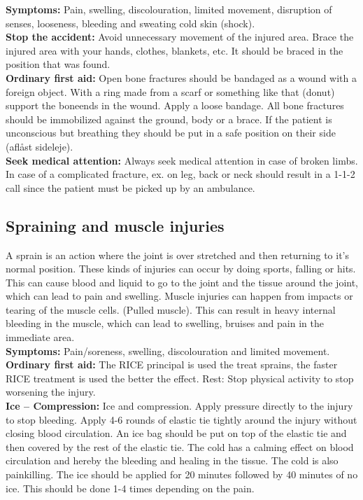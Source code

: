 \documentclass[../../../main.tex]{subfiles}
\begin{document}
\begin{multicols}{2}
\textbf{Symptoms:} Pain, swelling, discolouration, limited movement, disruption of senses, looseness, bleeding and sweating cold skin (shock).
\\

\textbf{Stop the accident:} Avoid unnecessary movement of the injured area. Brace the injured area with your hands, clothes, blankets, etc. It should be braced in the position that was found.
\\

\textbf{Ordinary first aid:} Open bone fractures should be bandaged as a wound with a foreign object. With a ring made from a scarf or something like that (donut) support the boneends in the wound. Apply a loose bandage. All bone fractures should be immobilized against the ground, body or a brace. If the patient is unconscious but breathing they should be put in a safe position on their side (aflåst sideleje).
\\

\textbf{Seek medical attention:} Always seek medical attention in case of broken limbs. In case of a complicated fracture, ex. on leg, back or neck should result in a 1-1-2 call since the patient must be picked up by an ambulance.
\\
\subsection*{Spraining and muscle injuries}
A sprain is an action where the joint is over stretched and then returning to it's normal position. These kinds of injuries can occur by doing sports, falling or hits. This can cause blood and liquid to go to the joint and the tissue around the joint, which can lead to pain and swelling. Muscle injuries can happen from impacts or tearing of the muscle cells. (Pulled muscle). This can result in heavy internal bleeding in the muscle, which can lead to swelling, bruises and pain in the immediate area.
\\

\textbf{Symptoms:} Pain/soreness, swelling, discolouration and limited movement.
\\

\textbf{Ordinary first aid:} The RICE principal is used the treat sprains, the faster RICE treatment is used the better the effect. Rest: Stop physical activity to stop worsening the injury.
\\

\textbf{Ice – Compression:} Ice and compression. Apply pressure directly to the injury to stop bleeding. Apply 4-6 rounds of elastic tie tightly around the injury without closing blood circulation. An ice bag should be put on top of the elastic tie and then covered by the rest of the elastic tie. The cold has a calming effect on blood circulation and hereby the bleeding and healing in the tissue. The cold is also painkilling. The ice should be applied for 20 minutes followed by 40 minutes of no ice. This should be done 1-4 times depending on the pain.
\\


\end{multicols}
\end{document}
